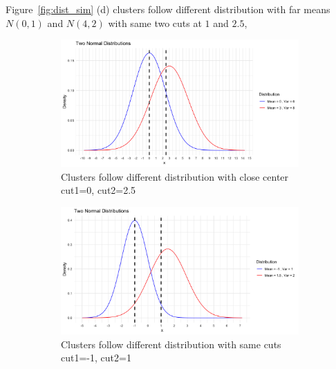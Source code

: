 \documentclass{article}
\begin{document}
Figure~\ref*{fig:dist_sim} (d) clusters follow different distribution with far means $N(0,1)$ and $N(4,2)$
with same two cuts at $1$ and $2.5$,

\begin{figure}[ht]
  \centering
  \begin{subfigure}{0.32\textwidth}  %
    \centering
    \includegraphics[width=\textwidth]{images/dist_simu/nor_close.png} %
    \caption{Clusters follow different distribution with close center\\ cut1=0, cut2=2.5}
\end{subfigure}
  \hfill
  \begin{subfigure}{0.32\textwidth}  %
    \centering
    \includegraphics[width=\textwidth]{images/dist_simu/nor.png} %
    \caption{Clusters follow different distribution with same cuts\\ cut1=-1, cut2=1}
\end{subfigure}
  \hfill
  \begin{subfigure}{0.32\textwidth}  %

\end{subfigure}
\end{figure}
\end{document}
